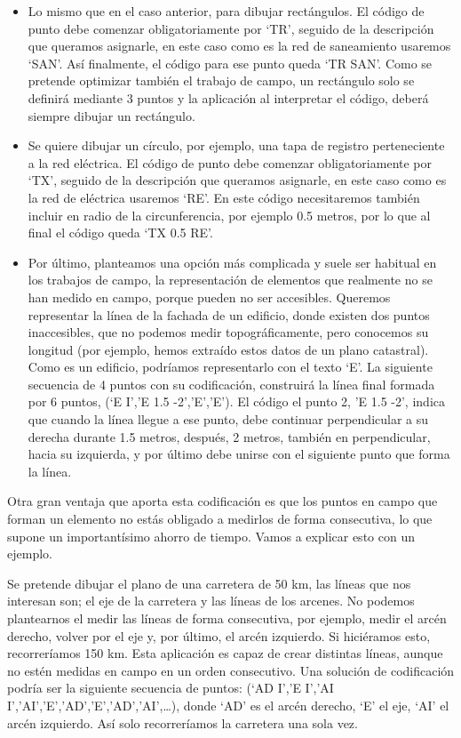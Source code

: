 \begin{itemize}
\item Lo mismo que en el caso anterior, para dibujar rectángulos. El código de punto debe comenzar obligatoriamente por ‘TR’, seguido de la descripción que queramos asignarle, en este caso como es la red de saneamiento usaremos ‘SAN’. Así finalmente, el código para ese punto queda ‘TR SAN’. Como se pretende optimizar también el trabajo de campo, un rectángulo solo se definirá mediante 3 puntos y la aplicación al interpretar el código, deberá siempre dibujar un rectángulo.

\item Se quiere dibujar un círculo, por ejemplo, una tapa de registro perteneciente a la red eléctrica.  El código de punto debe comenzar obligatoriamente por ‘TX’, seguido de la descripción que queramos asignarle, en este caso como es la red de eléctrica usaremos ‘RE’. En este código necesitaremos también incluir en radio de la circunferencia, por ejemplo 0.5 metros, por lo que al final el código queda ‘TX 0.5 RE’.

\item Por último, planteamos una opción más complicada y suele ser habitual en los trabajos de campo, la representación de elementos que realmente no se han medido en campo, porque pueden no ser accesibles. Queremos representar la línea de la fachada de un edificio, donde existen dos puntos inaccesibles, que no podemos medir topográficamente, pero conocemos su longitud (por ejemplo, hemos extraído estos datos de un plano catastral). Como es un edificio, podríamos representarlo con el texto ‘E’. La siguiente secuencia de 4 puntos con su codificación, construirá la línea final formada por 6 puntos, (‘E I’,’E 1.5 -2’,’E’,’E’). El código el punto 2, ’E 1.5 -2’, indica que cuando la línea llegue a ese punto, debe continuar perpendicular a su derecha durante 1.5 metros, después, 2 metros, también en perpendicular, hacia su izquierda, y por último debe unirse con el siguiente punto que forma la línea. 

\end{itemize}

Otra gran ventaja que aporta esta codificación es que los puntos en campo que forman un elemento no estás obligado a medirlos de forma consecutiva, lo que supone un importantísimo ahorro de tiempo. Vamos a explicar esto con un ejemplo.

Se pretende dibujar el plano de una carretera de 50 km, las líneas que nos interesan son; el eje de la carretera y las líneas de los arcenes. No podemos plantearnos el medir las líneas de forma consecutiva, por ejemplo, medir el arcén derecho, volver por el eje y, por último, el arcén izquierdo. Si hiciéramos esto, recorreríamos 150 km. Esta aplicación es capaz de crear distintas líneas, aunque no estén medidas en campo en un orden consecutivo. Una solución de codificación podría ser la siguiente secuencia de puntos: (‘AD I’,’E I’,’AI I’,’AI’,’E’,’AD’,’E’,’AD’,’AI’,…), donde ‘AD’ es el arcén derecho, ‘E’ el eje, ‘AI’ el arcén izquierdo. Así solo recorreríamos la carretera una sola vez. 

